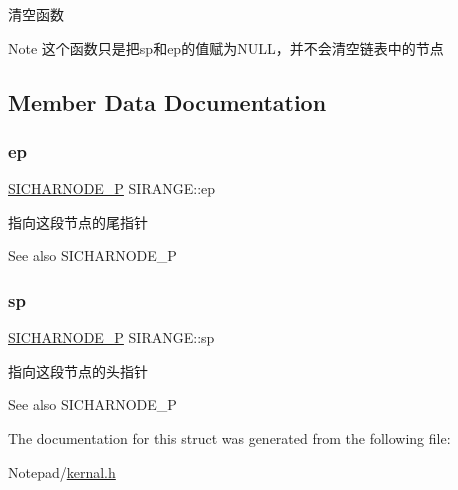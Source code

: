 清空函数~\newline


\begin{DoxyNote}{Note}
这个函数只是把sp和ep的值赋为\+N\+U\+L\+L，并不会清空链表中的节点 
\end{DoxyNote}


\subsection{Member Data Documentation}
\mbox{\label{struct_s_i_r_a_n_g_e_aaa89b5ae16be7b890eba048bc212feec}} 
\subsubsection{\texorpdfstring{ep}{ep}}
{\footnotesize\ttfamily \hyperlink{class_s_i_c_h_a_r_n_o_d_e}{S\+I\+C\+H\+A\+R\+N\+O\+D\+E\+\_\+P} S\+I\+R\+A\+N\+G\+E\+::ep}



指向这段节点的尾指针 

\begin{DoxySeeAlso}{See also}
S\+I\+C\+H\+A\+R\+N\+O\+D\+E\+\_\+P 
\end{DoxySeeAlso}
\mbox{\label{struct_s_i_r_a_n_g_e_a7acdf296d873d6ed6fc203674109b715}} 
\subsubsection{\texorpdfstring{sp}{sp}}
{\footnotesize\ttfamily \hyperlink{class_s_i_c_h_a_r_n_o_d_e}{S\+I\+C\+H\+A\+R\+N\+O\+D\+E\+\_\+P} S\+I\+R\+A\+N\+G\+E\+::sp}



指向这段节点的头指针 

\begin{DoxySeeAlso}{See also}
S\+I\+C\+H\+A\+R\+N\+O\+D\+E\+\_\+P 
\end{DoxySeeAlso}


The documentation for this struct was generated from the following file\+:\begin{DoxyCompactItemize}
\item 
Notepad/\hyperlink{kernal_8h}{kernal.\+h}\end{DoxyCompactItemize}
